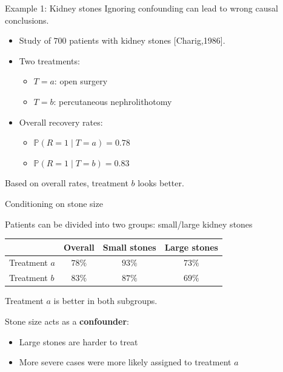 \documentclass[dvipsnames,aspectratio=169,handout]{beamer}
\begin{document}
\begin{frame}{Example 1: Kidney stones}
Ignoring confounding can lead to wrong causal conclusions.

\begin{itemize}
\item Study of $700$ patients with kidney stones [Charig,1986].
\item Two treatments:
\begin{itemize}
  \item $T=a$: open surgery
  \item $T=b$: percutaneous nephrolithotomy
\end{itemize}
\item Overall recovery rates:
\begin{itemize}
  \item $\mathbb P(R=1 \mid T=a) = 0.78$
  \item $\mathbb P(R=1 \mid T=b) = 0.83$
\end{itemize}
\end{itemize}

\medskip
\alert{Based on overall rates, treatment $b$ looks better.}

\end{frame}


\begin{frame}{Conditioning on stone size}

Patients can be divided into two groups: small/large kidney stones

\medskip
\begin{center}
\begin{tabular}{lccc}
\hline
 & Overall & Small stones & Large stones \\
\hline
Treatment $a$ & $78\%$ & \alert{$93\%$} & \alert{$73\%$} \\
Treatment $b$ & \alert{$83\%$} & $87\%$ & $69\%$ \\
\hline
\end{tabular}
\end{center}

\medskip
\alert{Treatment $a$ is better in both subgroups.}

\medskip
Stone size acts as a \textbf{confounder}:
\begin{itemize}
\item Large stones are harder to treat
\item More severe cases were more likely assigned to treatment $a$
\end{itemize}

\end{frame}
\end{document}
